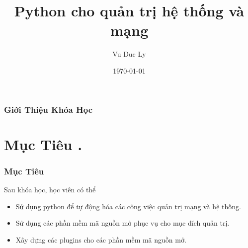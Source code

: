 \documentclass{beamer}
\title[Python cho quản trị hệ thống và mạng]{Python cho quản trị hệ thống và mạng } %
\author{Vu Duc Ly} %
\date{\today} %
\begin{document}
\begin{frame}
\titlepage %
\hyperlink{intro}{}
\end{frame}

\begin{frame}[label=intro]
\frametitle{Giới Thiệu Khóa Học} %
\tableofcontents %
\end{frame}


\section{Mục Tiêu .} 
\begin{frame}[label=muctieu]
\frametitle{Mục Tiêu}
Sau khóa học, học viên có thể
\begin{itemize}
\item Sử dụng python để tự động hóa các công việc quản trị mạng và hệ thống.
\item Sử dụng các phần mềm mã nguồn mở phục vụ cho mục đích quản trị.
\item Xây dựng các plugins cho các phần mềm mã nguồn mở.
\end{itemize} 

\hyperlink{currentwork}{}
\hyperlink{model}{}
\end{frame}
\end{document}

